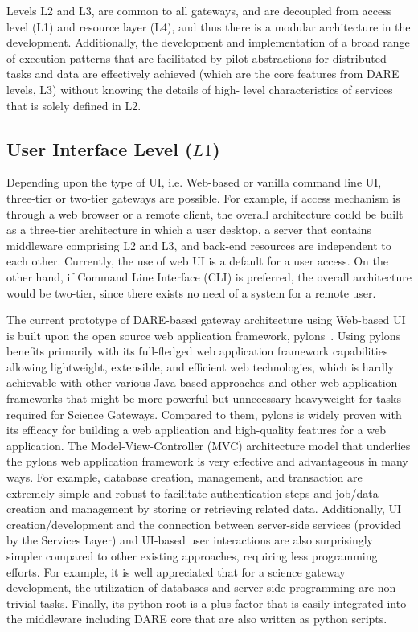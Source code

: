 \documentclass[]{svjour3}
\begin{document}
Levels L2 and L3, are common to all gateways, and are decoupled from
access level (L1) and resource layer (L4), and thus there is a modular
architecture in the development. Additionally, the development and
implementation of a broad range of execution patterns that are
facilitated by pilot abstractions for distributed tasks and data are
effectively achieved (which are the core features from DARE levels,
L3) without knowing the details of high- level characteristics of
services that is solely defined in L2.

\subsection{User Interface Level ($L1$)}
 Depending upon the
type of UI, i.e. Web-based or vanilla command line UI, three-tier or
two-tier gateways are possible. For example, if access mechanism is
through a web browser or a remote client, the overall architecture
could be built as a three-tier architecture in which a user desktop, a
server that contains middleware comprising L2 and L3, and back-end
resources are independent to each other. Currently, the use of web UI
is a default for a user access. On the other hand, if Command Line
Interface (CLI) is preferred, the overall architecture would be
two-tier, since there exists no need of a system for a remote user.
 
The current prototype of DARE-based gateway architecture using
Web-based UI is built upon the open source web application framework,
pylons~\cite{bigjob_cloudcom10}. Using pylons benefits primarily with its
full-fledged web application framework capabilities allowing
lightweight, extensible, and efficient web technologies, which is
hardly achievable with other various Java-based approaches and other
web application frameworks that might be more powerful but unnecessary
heavyweight for tasks required for Science Gateways. Compared to them,
pylons is widely proven with its efficacy for building a web
application and high-quality features for a web application.  The
Model-View-Controller (MVC) architecture model that underlies the
pylons web application framework \cite{bigjob_cloudcom10} is very effective
and advantageous in many ways. For example, database creation,
management, and transaction are extremely simple and robust to
facilitate authentication steps and job/data creation and management
by storing or retrieving related data. Additionally, UI
creation/development and the connection between server-side services
(provided by the Services Layer) and UI-based user interactions are
also surprisingly simpler compared to other existing approaches,
requiring less programming efforts. For example, it is well
appreciated that for a science gateway development, the utilization of
databases and server-side programming are non-trivial tasks. Finally,
its python root is a plus factor that is easily integrated into the
middleware including DARE core that are also written as python
scripts.
\end{document}
